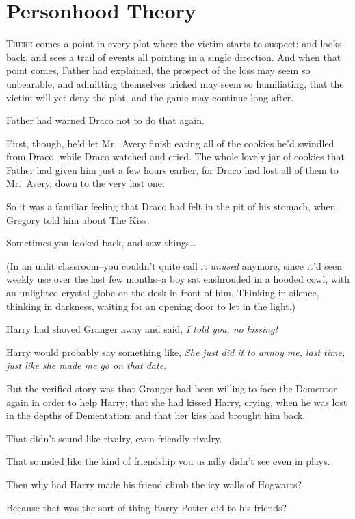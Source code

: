 \chapter{Personhood Theory}

\lettrine{T}{here} comes a point in every plot where the victim starts to suspect; and looks back, and sees a trail of events all pointing in a single direction. And when that point comes, Father had explained, the prospect of the loss may seem so unbearable, and admitting themselves tricked may seem so humiliating, that the victim will yet deny the plot, and the game may continue long after.

Father had warned Draco not to do that again.

First, though, he'd let Mr.~Avery finish eating all of the cookies he'd swindled from Draco, while Draco watched and cried. The whole lovely jar of cookies that Father had given him just a few hours earlier, for Draco had lost all of them to Mr.~Avery, down to the very last one.

So it was a familiar feeling that Draco had felt in the pit of his stomach, when Gregory told him about The Kiss.

Sometimes you looked back, and saw things{\ldots}

(In an unlit classroom\---you couldn't quite call it \emph{unused} anymore, since it'd seen weekly use over the last few months\---a boy sat enshrouded in a hooded cowl, with an unlighted crystal globe on the desk in front of him. Thinking in silence, thinking in darkness, waiting for an opening door to let in the light.)

Harry had shoved Granger away and said, \emph{I told you, no kissing!}

Harry would probably say something like, \emph{She just did it to annoy me, last time, just like she made me go on that date.}

But the verified story was that Granger had been willing to face the Dementor again in order to help Harry; that she had kissed Harry, crying, when he was lost in the depths of Dementation; and that her kiss had brought him back.

That didn't sound like rivalry, even friendly rivalry.

That sounded like the kind of friendship you usually didn't see even in plays.

Then why had Harry made his friend climb the icy walls of Hogwarts?

Because that was the sort of thing Harry Potter did to his friends?

